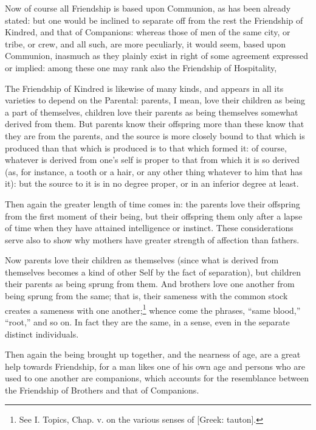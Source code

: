 
Now of course all Friendship is based upon Communion, as has been already
stated: but one would be inclined to separate off from the rest the Friendship
of Kindred, and that of Companions: whereas those of men of the same city, or
tribe, or crew, and all such, are more peculiarly, it would seem, based upon
Communion, inasmuch as they plainly exist in right of some agreement expressed
or implied: among these one may rank also the Friendship of Hospitality,

The Friendship of Kindred is likewise of many kinds, and appears in all its
varieties to depend on the Parental: parents, I mean, love their children as
being a part of themselves, children love their parents as being themselves
somewhat derived from them. But parents know their offspring more than these
know that they are from the parents, and the source is more closely bound to
that which is produced than that which is produced is to that which formed it:
of course, whatever is derived from one’s self is proper to that from
which it is so derived (as, for instance, a tooth or a hair, or any other thing
whatever to him that has it): but the source to it is in no degree proper, or
in an inferior degree at least.

Then again the greater length of time comes in: the parents love their
offspring from the first moment of their being, but their offspring them only
after a lapse of time when they have attained intelligence or instinct. These
considerations serve also to show why mothers have greater strength of
affection than fathers.

Now parents love their children as themselves (since what is derived from
themselves becomes a kind of other Self by the fact of separation), but
children their parents as being sprung from them. And brothers love one another
from being sprung from the same; that is, their sameness with the common stock
creates a sameness with one another;\footnote{See I. Topics, Chap. v. on the various senses of [Greek: tauton].}
whence come the phrases, “same blood,” “root,” and so
on. In fact they are the same, in a sense, even in the separate distinct
individuals.

Then again the being brought up together, and the nearness of age, are a great
help towards Friendship, for a man likes one of his own age and persons who are
used to one another are companions, which accounts for the resemblance between
the Friendship of Brothers and that of Companions.

